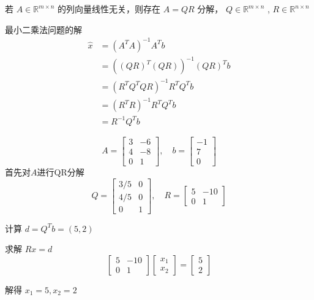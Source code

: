 \begin{theorem}[QR分解求解最小二乘法]
    若 $ {A} \in \mathbb{R}^{m \times n} $ 的列向量线性无关，则存在 $ {A}={QR} $ 分解， $ Q \in \mathbb{R}^{m \times n} $ , $ R \in \mathbb{R}^{{n} \times n} $ 
    
    最小二乘法问题的解
\begin{equation}
\begin{aligned}
\hat{x}&=\left(A^{T} A\right)^{-1} A^{T} b \\
&=\left((Q R)^{T}(Q R)\right)^{-1}(Q R)^{T} b \\
&=\left(R^{T} Q^{T} Q R\right)^{-1} R^{T} Q^{T} b \\
&=\left(R^{T} R\right)^{-1} R^{T} Q^{T} b \\
&=R^{-1} Q^{T} b
\end{aligned}
\end{equation}
\end{theorem}


\begin{example}
    \begin{equation}
A=\left[\begin{array}{cc}
3 & -6 \\
4 & -8 \\
0 & 1
\end{array}\right], \quad b=\left[\begin{array}{c}
-1 \\
7 \\
0
\end{array}\right]
\end{equation}
首先对$A$进行QR分解
\begin{equation}
Q=\left[\begin{array}{cc}
3 / 5 & 0 \\
4 / 5 & 0 \\
0 & 1
\end{array}\right], \quad R=\left[\begin{array}{cc}
5 & -10 \\
0 & 1
\end{array}\right]
\end{equation}

计算 $ d=Q^{T} b=(5,2) $

求解 $ R x=d $
\begin{equation}
\left[\begin{array}{cc}
5 & -10 \\
0 & 1
\end{array}\right]\left[\begin{array}{l}
x_{1} \\
x_{2}
\end{array}\right]=\left[\begin{array}{l}
5 \\
2
\end{array}\right]
\end{equation}

解得 $ x_{1}=5, x_{2}=2 $

\end{example}



